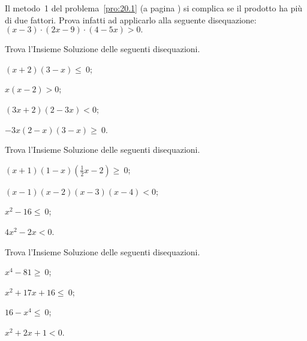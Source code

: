 \begin{esercizio}
 \label{ese:20.46}
 Il metodo~1 del problema~\ref{pro:20.1} (a pagina \pageref{pro:20.1}) si complica se il prodotto ha
più di due fattori. Prova infatti ad applicarlo alla seguente
disequazione:
$(x-3)\cdot (2x-9)\cdot (4-5x)>0.$
\end{esercizio}

\begin{esercizio}[\Ast]
 \label{ese:20.47}
Trova l'Insieme Soluzione delle seguenti disequazioni.
\begin{multicols}{2}
 \begin{enumeratea}
 \item $(x+2)(3-x)\le~0$;
\item $x(x-2)>0$;
\item $(3x+2)(2-3x)<0$;
\item $-3x(2-x)(3-x)\ge~0$.
\end{enumeratea}
\end{multicols}
\end{esercizio}

\begin{esercizio}[\Ast]
 \label{ese:20.48}
Trova l'Insieme Soluzione delle seguenti disequazioni.
\begin{multicols}{2}
 \begin{enumeratea}
 \item $(x+1)(1-x)\left(\frac{1}{2}x-2\right)\ge~0$;
\item $(x-1)(x-2)(x-3)(x-4)<0$;
\item $x^{2}-16\le~0$;
\item $4x^{2}-2x<0$.
\end{enumeratea}
\end{multicols}
\end{esercizio}

\begin{esercizio}[\Ast]
 \label{ese:20.49}
Trova l'Insieme Soluzione delle seguenti disequazioni.
\begin{multicols}{2}
 \begin{enumeratea}
 \item $x^{4}-81\ge~0$;
\item $x^{2}+17x+16\le~0$;
\item $16-x^{4}\le~0$;
\item $x^{2}+2x+1<0$.
\end{enumeratea}
\end{multicols}
\end{esercizio}

\pagebreak

